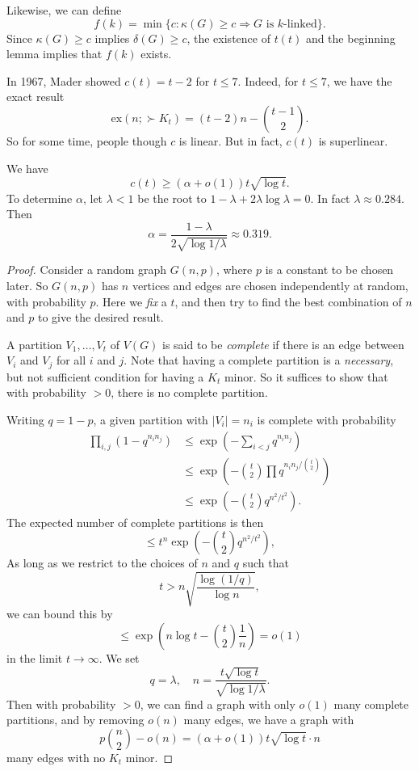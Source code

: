 \documentclass[a4paper]{article}
\renewcommand\ex{\mathrm{ex}}
\begin{document}
Likewise, we can define
\[
  f(k) = \min \{c: \kappa(G) \geq c \Rightarrow G \text{ is $k$-linked}\}.
\]
Since $\kappa(G) \geq c$ implies $\delta(G) \geq c$, the existence of $t(t)$ and the beginning lemma implies that $f(k)$ exists.

In 1967, Mader showed $c(t) = t - 2$ for $t \leq 7$. Indeed, for $t \leq 7$, we have the exact result
\[
  \ex(n; \succ K_t) = (t - 2) n - \binom{t - 1}{2}.
\]
So for some time, people though $c$ is linear. But in fact, $c(t)$ is superlinear.

\begin{lemma}
  We have
  \[
    c(t) \geq (\alpha + o(1)) t \sqrt{\log t}.
  \]
  To determine $\alpha$, let $\lambda < 1$ be the root to $1 - \lambda + 2 \lambda \log \lambda = 0$. In fact $\lambda \approx 0.284$. Then
  \[
    \alpha = \frac{1 - \lambda}{2 \sqrt{\log 1/\lambda}} \approx 0.319.
  \]
\end{lemma}

\begin{proof}
  Consider a random graph $G(n, p)$, where $p$ is a constant to be chosen later. So $G(n, p)$ has $n$ vertices and edges are chosen independently at random, with probability $p$. Here we \emph{fix} a $t$, and then try to find the best combination of $n$ and $p$ to give the desired result.

  A partition $V_1, \ldots, V_t$ of $V(G)$ is said to be \emph{complete} if there is an edge between $V_i$ and $V_j$ for all $i$ and $j$. Note that having a complete partition is a \emph{necessary}, but not sufficient condition for having a $K_t$ minor. So it suffices to show that with probability $> 0$, there is no complete partition.

  Writing $q = 1 - p$, a given partition with $|V_i| = n_i$ is complete with probability
  \begin{align*}
    \prod_{i, j}(1 - q^{n_i n_j}) &\leq \exp\left(- \sum_{i < j} q^{n_i n_j}\right)\\
    &\leq \exp \left(- \binom{t}{2}\prod q^{n_i n_j/\binom{t}{2}}\right) \tag{AM-GM}\\
    &\leq \exp \left(- \binom{t}{2} q^{n^2/t^2}\right).
  \end{align*}
  The expected number of complete partitions is then
  \[
    \leq t^n \exp \left(- \binom{t}{2} q^{n^2/t^2}\right),
  \]
  As long as we restrict to the choices of $n$ and $q$ such that
  \[
    t > n \sqrt{\frac{\log(1/q)}{\log n}},
  \]
  we can bound this by
  \[
    \leq \exp \left(n \log t - \binom{t}{2} \frac{1}{n} \right) = o(1)
  \]
  in the limit $t \to \infty$. We set
  \[
    q = \lambda,\quad n = \frac{t \sqrt{\log t}}{\sqrt{\log 1/\lambda}}.
  \]
  Then with probability $>0$, we can find a graph with only $o(1)$ many complete partitions, and by removing $o(n)$ many edges, we have a graph with
  \[
    p \binom{n}{2} - o(n) = (\alpha + o(1)) t \sqrt{\log t} \cdot n
  \]
  many edges with no $K_t$ minor.
\end{proof}
\end{document}
